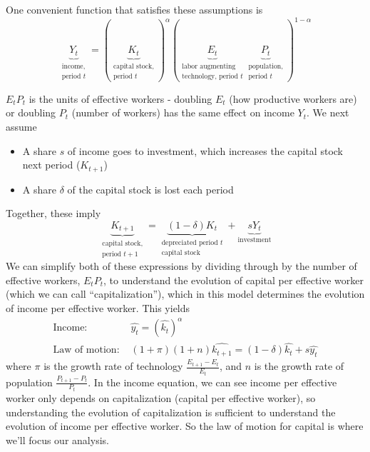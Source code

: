 \documentclass[12pt,english]{article}
\begin{document}
One convenient function that satisfies these assumptions is
$$ \underbrace{Y_{t}}_{\substack{\text{income,} \\ \text{period } t}} = ( \underbrace{K_{t}}_{\substack{\text{capital stock,} \\ \text{period } t}} )^{\alpha} ( \underbrace{E_{t}}_{\substack{\text{labor augmenting} \\ \text{technology, period } t}} \underbrace{P_{t}}_{\substack{\text{population,} \\ \text{period } t}} )^{1 - \alpha} $$

$E_{t} P_{t}$ is the units of effective workers - doubling $E_{t}$ (how productive workers are) or doubling $P_{t}$ (number of workers) has the same effect on income $Y_{t}$. We next assume
\begin{itemize}
	\item A share $s$ of income goes to investment, which increases the capital stock next period ($K_{t + 1}$)
	\item A share $\delta$ of the capital stock is lost each period
\end{itemize}
Together, these imply
$$ \underbrace{K_{t + 1}}_{\substack{\text{capital stock,} \\ \text{period } t + 1}} = \underbrace{(1 - \delta) K_{t}}_{\substack{\text{depreciated period } t \\ \text{capital stock}}} + \underbrace{s Y_{t}}_{\text{investment}} $$
We can simplify both of these expressions by dividing through by the number of effective workers, $E_{t} P_{t}$, to understand the evolution of capital per effective worker (which we can call ``capitalization''), which in this model determines the evolution of income per effective worker. This yields
\begin{align*}
\text{Income: } & \widehat{y_{t}} = \left( \widehat{k_{t}} \right)^{\alpha} \\
\text{Law of motion: } & (1 + \pi) (1 + n) \widehat{k_{t+1}} = (1 - \delta) \widehat{k_{t}} + s \widehat{y_{t}}
\end{align*}
where $\pi$ is the growth rate of technology $\frac{E_{t+1} - E_{t}}{E_{t}}$, and $n$ is the growth rate of population $\frac{P_{t + 1} - P_{t}}{P_{t}}$. In the income equation, we can see income per effective worker only depends on capitalization (capital per effective worker), so understanding the evolution of capitalization is sufficient to understand the evolution of income per effective worker. So the law of motion for capital is where we'll focus our analysis.
\end{document}
